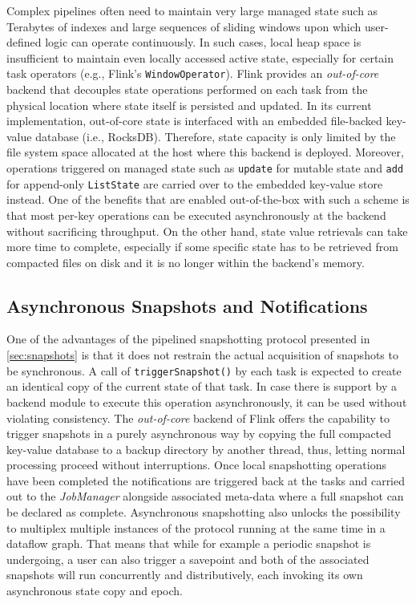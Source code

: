 Complex pipelines often need to maintain very large managed state such as Terabytes of indexes and large sequences of sliding windows upon which user-defined logic can operate continuously. In such cases, local heap space is insufficient to maintain even locally accessed active state, especially for certain task operators (e.g., Flink's \texttt{WindowOperator}). Flink provides an \emph{out-of-core} backend that decouples state operations performed on each task from the physical location where state itself is persisted and updated. In its current implementation, out-of-core state is interfaced with an embedded file-backed key-value database (i.e., RocksDB). Therefore, state capacity is only limited by the file system space allocated at the host where this backend is deployed. Moreover, operations triggered on managed state such as \texttt{update} for mutable state and \texttt{add} for append-only \texttt{ListState} are carried over to the embedded key-value store instead. One of the benefits that are enabled out-of-the-box with such a scheme is that most per-key operations can be executed asynchronously at the backend without sacrificing throughput. On the other hand, state value retrievals can take more time to complete, especially if some specific state has to be retrieved from compacted files on disk and it is no longer within the backend's memory. 

\subsection{Asynchronous Snapshots and Notifications}
\label{sec:async}
One of the advantages of the pipelined snapshotting protocol presented in \autoref{sec:snapshots} is that it does not restrain the actual acquisition of snapshots to be synchronous. A call of \texttt{triggerSnapshot()} by each task is expected to create an identical copy of the current state of that task. In case there is support by a backend module to execute this operation asynchronously, it can be used without violating consistency. The \emph{out-of-core} backend of Flink offers the capability to trigger snapshots in a purely asynchronous way by copying the full compacted key-value database to a backup directory by another thread, thus, letting normal processing proceed without interruptions. Once local snapshotting operations have been completed the notifications are triggered back at the tasks and carried out to the \emph{JobManager} alongside associated meta-data where a full snapshot can be declared as complete. Asynchronous snapshotting also unlocks the possibility to multiplex multiple instances of the protocol running at the same time in a dataflow graph. That means that while for example a periodic snapshot is undergoing, a user can also trigger a savepoint and both of the associated snapshots will run concurrently and distributively, each invoking its own asynchronous state copy and epoch.

